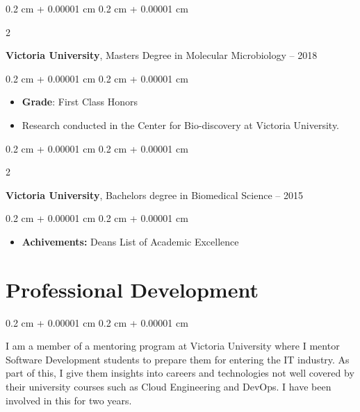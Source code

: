 \documentclass[10pt, letterpaper]{article}
\newenvironment{highlights}{
    \begin{itemize}[
        topsep=0.10 cm,
        parsep=0.10 cm,
        partopsep=0pt,
        itemsep=0pt,
        leftmargin=0.4 cm + 10pt
    ]
}{
    \end{itemize}
} %
\newenvironment{onecolentry}{
    \begin{adjustwidth}{
        0.2 cm + 0.00001 cm
    }{
        0.2 cm + 0.00001 cm
    }
}{
    \end{adjustwidth}
} %
\newenvironment{twocolentry}[2][]{
    \onecolentry
    \def\secondColumn{#2}
    \setcolumnwidth{\fill, 4.5 cm}
    \begin{paracol}{2}
}{
    \switchcolumn \raggedleft \secondColumn
    \end{paracol}
    \endonecolentry
} %
\begin{document}
        \vspace{0.2 cm}

        \begin{twocolentry}{
            2016 – 2018
        }
            \textbf{Victoria University}, Masters Degree in Molecular Microbiology\end{twocolentry}

        \vspace{0.10 cm}
        \begin{onecolentry}
            \begin{highlights}
                \item \textbf{Grade}: First Class Honors
                \item Research conducted in the Center for Bio-discovery at Victoria University.
            \end{highlights}
        \end{onecolentry}


        \vspace{0.2 cm}

        \begin{twocolentry}{
            2013 – 2015
        }
            \textbf{Victoria University}, Bachelors degree in Biomedical Science\end{twocolentry}

        \vspace{0.10 cm}
        \begin{onecolentry}
            \begin{highlights}
                \item \textbf{Achivements:} Deans List of Academic Excellence
            \end{highlights}
        \end{onecolentry}



    
    \section{Professional Development}



        
        \begin{onecolentry}
            I am a member of a mentoring program at Victoria University where I mentor Software Development students to prepare them for entering the IT industry. As part of this, I give them insights into careers and technologies not well covered by their university courses such as Cloud Engineering and DevOps. I have been involved in this for two years.
        \end{onecolentry}
\end{document}
